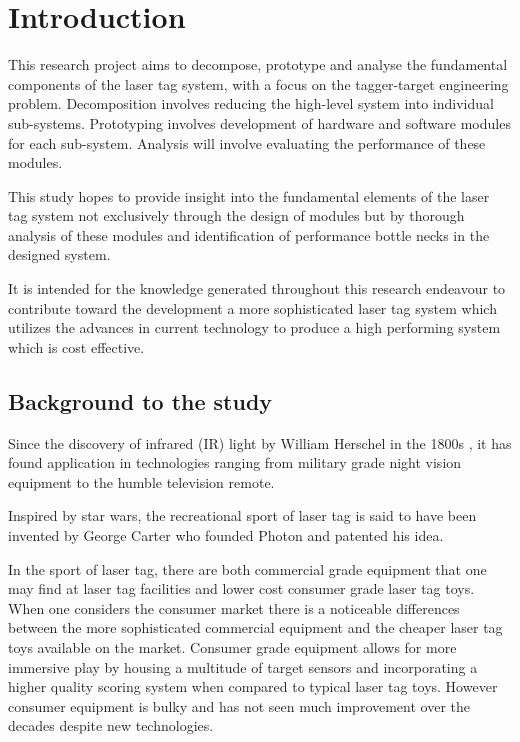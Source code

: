 \chapter{Introduction}
\label{ch_introduction}

This research project aims to decompose, prototype and analyse the fundamental components of the laser tag system, with a focus on the tagger-target engineering problem. Decomposition involves reducing the high-level system into individual sub-systems. Prototyping involves development of hardware and software modules for each sub-system. Analysis will involve evaluating the performance of these modules.

This study hopes to provide insight into the fundamental elements of the laser tag system not exclusively through the design of modules but by thorough analysis of these modules and identification of performance bottle necks in the designed system.

It is intended for the knowledge generated throughout this research endeavour to contribute toward the development a more sophisticated laser tag system which utilizes the advances in current technology to produce a high performing system which is cost effective.

\section{Background to the study}
Since the discovery of infrared (IR) light by William Herschel in the 1800s \cite{Rowan-Robinson2013}, it has found application in technologies ranging from military grade night vision equipment to the humble television remote.

Inspired by star wars, the recreational sport of laser tag is said to have been invented by George Carter who founded Photon and patented his idea\cite{Carter1986}.

In the sport of laser tag, there are both commercial grade equipment that one may find at laser tag facilities and lower cost consumer grade laser tag toys. When one considers the consumer market there is a noticeable differences between the more sophisticated commercial equipment and the cheaper laser tag toys available on the market. Consumer grade equipment allows for more immersive play by housing a multitude of target sensors and incorporating a higher quality scoring system when compared to typical laser tag toys. However consumer equipment is bulky and has not seen much improvement over the decades despite new technologies.

